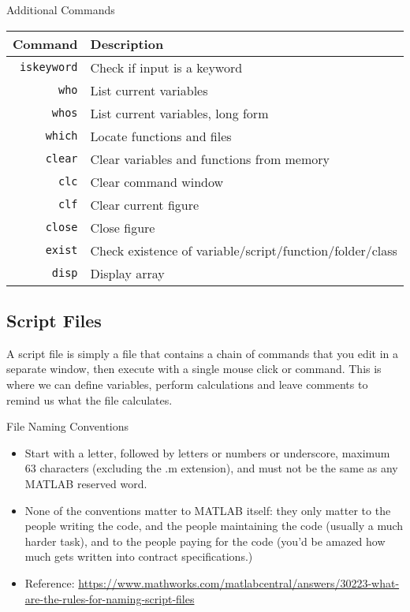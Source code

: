 \begin{frame}{Additional Commands}
\protect\hypertarget{additional-commands}{}
\begin{table}[!hbtp]
  \begin{tabular}{rl}
    Command            & Description \\
    \hline
    \texttt{iskeyword} & Check if input is a keyword \\
    \texttt{who}       & List current variables \\
    \texttt{whos}      & List current variables, long form \\
    \texttt{which}     & Locate functions and files \\
    \texttt{clear}     & Clear variables and functions from memory \\
    \texttt{clc}       & Clear command window \\
    \texttt{clf}       & Clear current figure \\
    \texttt{close}     & Close figure \\
    \texttt{exist}     & Check existence of variable/script/function/folder/class \\
    \texttt{disp}      & Display array \\
  \end{tabular}
\end{table}
\end{frame}

\hypertarget{script-files}{%
\subsection{Script Files}\label{script-files}}

\begin{frame}{}
\protect\hypertarget{section-1}{}
A script file is simply a file that contains a chain of commands that
you edit in a separate window, then execute with a single mouse click or
command. This is where we can define variables, perform calculations and
leave comments to remind us what the file calculates.
\end{frame}

\begin{frame}{File Naming Conventions}
\protect\hypertarget{file-naming-conventions}{}
\begin{itemize}[<+->]
\tightlist
\item
  Start with a letter, followed by letters or numbers or underscore,
  maximum 63 characters (excluding the .m extension), and must not be
  the same as any MATLAB reserved word.
\item
  None of the conventions matter to MATLAB itself: they only matter to
  the people writing the code, and the people maintaining the code
  (usually a much harder task), and to the people paying for the code
  (you'd be amazed how much gets written into contract specifications.)
\item
  Reference:
  \url{https://www.mathworks.com/matlabcentral/answers/30223-what-are-the-rules-for-naming-script-files}
\end{itemize}
\end{frame}

